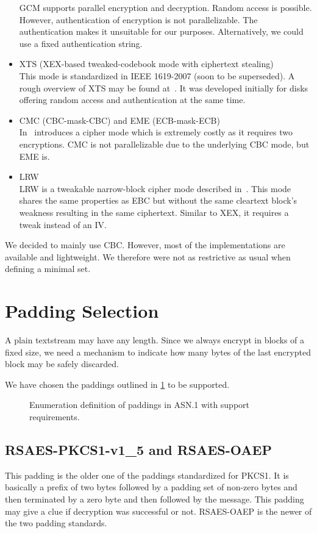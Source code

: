 \begin{itemize}
	GCM supports parallel encryption and decryption. Random access is possible. However, authentication of encryption is not parallelizable. The authentication makes it unsuitable for our purposes. Alternatively, we could use a fixed authentication string.
	\item XTS (XEX-based tweaked-codebook mode with ciphertext stealing)\\
	This mode is standardized in IEEE 1619-2007 (soon to be superseded). A rough overview of XTS may be found at~\cite{Martin2010}. It was developed initially for disks offering random access and authentication at the same time. 
	\item CMC (CBC-mask-CBC) and EME (ECB-mask-ECB)\\ 
	In~\cite{Halevi:2003} \citeauthor{Halevi:2003} introduces a cipher mode which is extremely costly as it requires two encryptions. CMC is not parallelizable due to the underlying CBC mode, but EME is. 
	\item LRW\\
	LRW is a tweakable narrow-block cipher mode described in~\cite{tschorsch:translayeranon}. This mode shares the same properties as EBC but without the same cleartext block's weakness resulting in the same ciphertext. Similar to XEX, it requires a tweak instead of an IV.
\end{itemize}

We decided to mainly use CBC. However, most of the implementations are available and lightweight. We therefore were not as restrictive as usual when defining a minimal set.

\section{Padding Selection}
A plain textstream may have any length. Since we always encrypt in blocks of a fixed size, we need a mechanism to indicate how many bytes of the last encrypted block may be safely discarded. 

We have chosen the paddings outlined in \cref{fig:defPaddings} to be supported.
\begin{figure}[ht]
	
	\caption{Enumeration definition of paddings in ASN.1 with support requirements.}
	\label{fig:defPaddings}
\end{figure}

\subsection{RSAES-PKCS1-v1\_5 and RSAES-OAEP}
This padding is the older one of the paddings standardized for PKCS1. It is basically a prefix of two bytes followed by a padding set of non-zero bytes and then terminated by a zero byte and then followed by the message. This padding may give a clue if decryption was successful or not. RSAES-OAEP is the newer of the two padding standards. 

